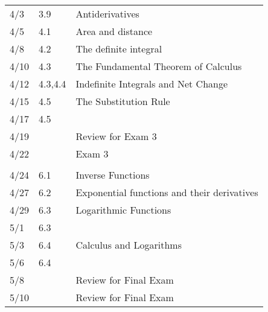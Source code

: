 \documentclass[10pt]{amsart}
\begin{document}
\begin{center}
\begin{tabular}{lll}
  
  4/3 & 3.9 & Antiderivatives\\
  4/5 & 4.1 & Area and distance\\
  4/8 & 4.2 & The definite integral\\
  4/10 & 4.3 & The Fundamental Theorem of Calculus\\
  4/12 & 4.3,4.4 & Indefinite Integrals and Net Change\\
  4/15 & 4.5 & The Substitution Rule\\
  4/17 & 4.5\\
  4/19 & & Review for Exam 3\\
  4/22 & & Exam 3\\
  \hline\\
  4/24 & 6.1 & Inverse Functions\\
  4/27 & 6.2 & Exponential functions and their derivatives\\
  4/29 & 6.3 & Logarithmic Functions\\
  5/1 & 6.3\\
  5/3 & 6.4 & Calculus and Logarithms\\
  5/6 & 6.4 \\
  5/8 & & Review for Final Exam\\
  5/10 & & Review for Final Exam\\
\end{tabular}
\end{center}
\end{document}
